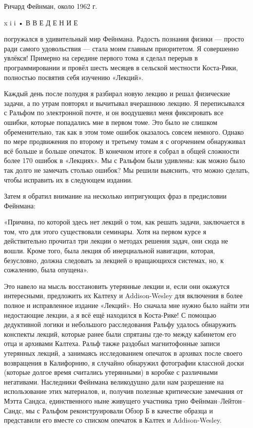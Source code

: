 \documentclass[10pt,oneside]{article}
\begin{document}
Ричард Фейнман, около 1962 г.\par

x i i • В В Е Д Е Н И Е\par

погружался в удивительный мир Фейнмана. Радость познания физики --- просто ради самого удовольствия --- стала моим главным приоритетом. Я совершенно увлёкся! Примерно на середине первого тома я сделал перерыв в программировании и провёл шесть месяцев в сельской местности Коста-Рики, полностью посвятив себя изучению «Лекций».\par

Каждый день после полудня я разбирал новую лекцию и решал физические задачи, а по утрам повторял и вычитывал вчерашнюю лекцию. Я переписывался с Ральфом по электронной почте, и он воодушевил меня фиксировать все ошибки, которые попадались мне в первом томе. Это было не слишком обременительно, так как в этом томе ошибок оказалось совсем немного. Однако по мере продвижения по второму и третьему томам я с огорчением обнаруживал всё больше и больше опечаток. В конечном итоге я собрал в общей сложности более 170 ошибок в «Лекциях». Мы с Ральфом были удивлены: как можно было так долго не замечать столько ошибок? Мы решили выяснить, что можно сделать, чтобы исправить их в следующем издании.\par

Затем я обратил внимание на несколько интригующих фраз в предисловии Фейнмана:\par

«Причина, по которой здесь нет лекций о том, как решать задачи, заключается в том, что для этого существовали семинары. Хотя на первом курсе я действительно прочитал три лекции о методах решения задач, они сюда не вошли. Кроме того, была лекция об инерциальной навигации, которая, безусловно, должна следовать за лекцией о вращающихся системах, но, к сожалению, была опущена».\par

Это навело на мысль восстановить утерянные лекции и, если они окажутся интересными, предложить их Калтеху и Addison-Wesley для включения в более полное и исправленное издание «Лекций». Но сначала мне нужно было найти эти недостающие лекции, а я всё ещё находился в Коста-Рике! С помощью дедуктивной логики и небольшого расследования Ральфу удалось обнаружить конспекты лекций, которые ранее были спрятаны где-то между кабинетом его отца и архивами Калтеха. Ральф также раздобыл магнитофонные записи утерянных лекций, а занимаясь исследованием опечаток в архивах после своего возвращения в Калифорнию, я случайно обнаружил фотографии классной доски (которые долгое время считались утерянными) в коробке с различными негативами. Наследники Фейнмана великодушно дали нам разрешение на использование этих материалов, и, получив полезные критические замечания от Мэтта Сандса, единственного ныне живущего участника трио Фейнман–Лейтон–Сандс, мы с Ральфом реконструировали Обзор Б в качестве образца и представили его вместе со списком опечаток в Калтех и Addison-Wesley.\par
\end{document}
